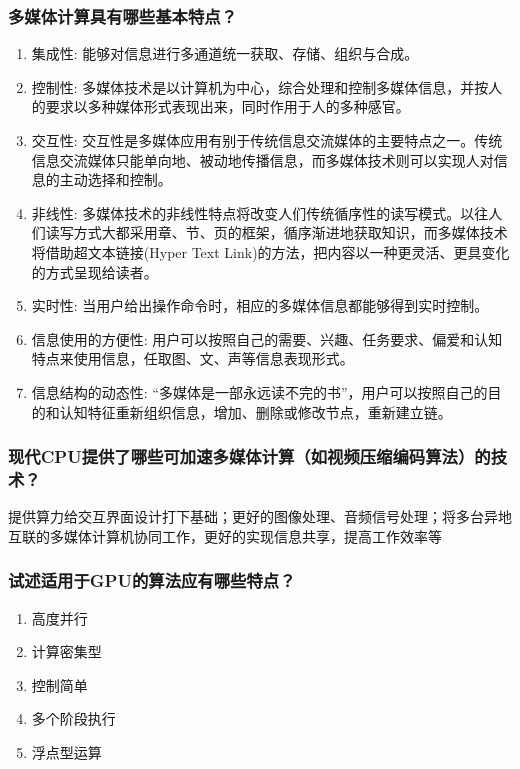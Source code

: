 \documentclass[UTF8,a4paper,AutoFakeBold,AutoFakeSlant]{ctexart}
\begin{document}
\subsubsection{多媒体计算具有哪些基本特点？}
\begin{enumerate}
  \item 集成性: 能够对信息进行多通道统一获取、存储、组织与合成。
  \item 控制性: 多媒体技术是以计算机为中心，综合处理和控制多媒体信息，并按人的要求以多种媒体形式表现出来，同时作用于人的多种感官。
  \item 交互性: 交互性是多媒体应用有别于传统信息交流媒体的主要特点之一。传统信息交流媒体只能单向地、被动地传播信息，而多媒体技术则可以实现人对信息的主动选择和控制。
  \item 非线性: 多媒体技术的非线性特点将改变人们传统循序性的读写模式。以往人们读写方式大都采用章、节、页的框架，循序渐进地获取知识，而多媒体技术将借助超文本链接(Hyper Text Link)的方法，把内容以一种更灵活、更具变化的方式呈现给读者。
  \item 实时性: 当用户给出操作命令时，相应的多媒体信息都能够得到实时控制。
  \item 信息使用的方便性: 用户可以按照自己的需要、兴趣、任务要求、偏爱和认知特点来使用信息，任取图、文、声等信息表现形式。
  \item 信息结构的动态性: “多媒体是一部永远读不完的书”，用户可以按照自己的目的和认知特征重新组织信息，增加、删除或修改节点，重新建立链。
\end{enumerate}


\subsubsection{现代CPU提供了哪些可加速多媒体计算（如视频压缩编码算法）的技术？}
提供算力给交互界面设计打下基础；更好的图像处理、音频信号处理；将多台异地互联的多媒体计算机协同工作，更好的实现信息共享，提高工作效率等


\subsubsection{试述适用于GPU的算法应有哪些特点？}
\begin{enumerate}
  \item 高度并行
  \item 计算密集型
  \item 控制简单
  \item 多个阶段执行
  \item 浮点型运算
\end{enumerate}
\end{document}
